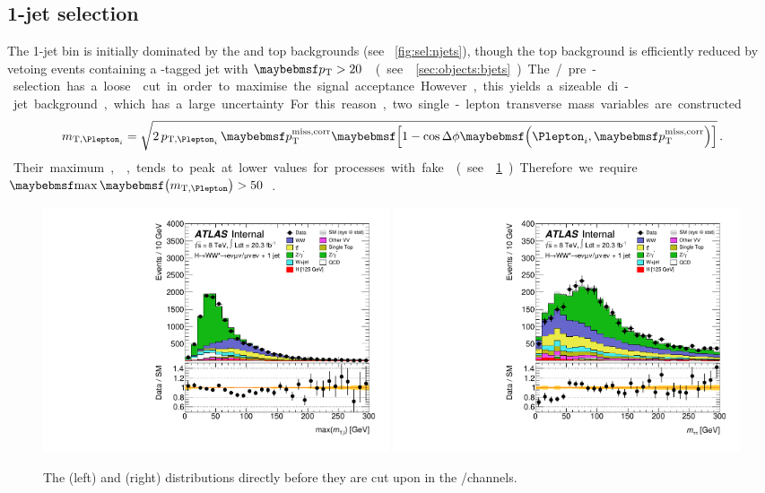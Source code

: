 \subsection{1-jet selection}
\label{sec:selection:1j}

The 1-jet bin is initially dominated by the \DY and top backgrounds (see 
\Figure~\ref{fig:sel:njets}), though the top background is efficiently reduced by vetoing 
events containing a \Pbottom-tagged jet with \unit{$\pt > 20$}{\GeV} (see 
\Section~\ref{sec:objects:bjets}).

The \emch/\mech pre-selection has a loose \corrtrackmet cut in order to maximise the 
signal acceptance. However, this yields a sizeable di-jet background, which has a large 
uncertainty. For this reason, two single-lepton transverse mass variables are constructed
\begin{equation}
	m_{\text{T,}\Plepton_i} = \sqrt{2 \, p_{\text{T,}\Plepton_i} \, \corrtrackmet 
	\sqbracs{1 - \cos\Delta\phi\parenths{\Plepton_i, \corrtrackmet}}} \,.
\end{equation}
Their maximum, \maxmtw, tends to peak at lower values for processes with fake \met (see 
\Figure~\ref{fig:sel:1j:df_cuts}). Therefore we require \unit{$\maxmtw > 50$}{\GeV}.

\begin{figure}
	\includegraphics[width=0.495\textwidth]{tex/selection/emme_CutbVeto_1jet_MaxMTW_TrackHWW_Clj_mh125_lin}
	\hfill
	\includegraphics[width=0.495\textwidth]{tex/selection/emme_CutMaxMTlep_1jet_Mtt_TrackHWW_Clj_mh125_lin}
	\caption{The \maxmtw (left) and \mtautau (right) distributions directly 
	before they are cut upon in the \emch/\mech channels.}
	\label{fig:sel:1j:df_cuts}
\end{figure}

